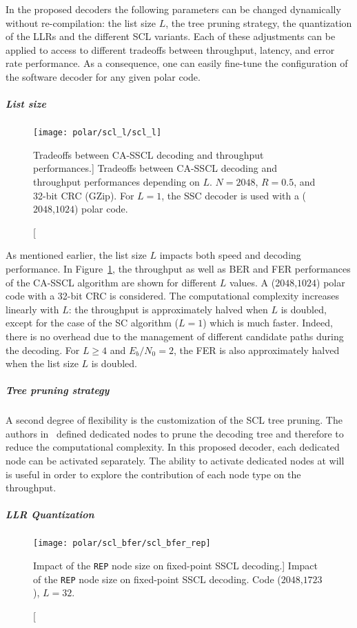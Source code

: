 In the proposed decoders the following parameters can be changed dynamically
without re-compilation: the list size $L$, the tree pruning strategy, the
quantization of the LLRs and the different SCL variants. Each of these
adjustments can be applied to access to different tradeoffs between throughput,
latency, and error rate performance. As a consequence, one can easily fine-tune
the configuration of the software decoder for any given polar code.

\subparagraph{List size}

\begin{figure}[htp]
  \centering
  \texttt{[image: polar/scl\_l/scl\_l]}
  \caption
    [Tradeoffs between CA-SSCL decoding and throughput performances.]
    {Tradeoffs between CA-SSCL decoding and throughput performances depending on
    $L$. $N=2048$, $R=0.5$, and 32-bit CRC (GZip). For $L=1$, the SSC decoder is
    used with a ($2048$,$1024$) polar code.}
  \label{plot:polar_scl_l}
\end{figure}

As mentioned earlier, the list size $L$ impacts both speed and decoding
performance. In Figure~\ref{plot:polar_scl_l}, the throughput as well as BER and
FER performances of the CA-SSCL algorithm are shown for different $L$ values. A
($2048$,$1024$) polar code with a 32-bit CRC is considered. The computational
complexity increases linearly with $L$: the throughput is approximately halved
when $L$ is doubled, except for the case of the SC algorithm ($L=1$) which is
much faster. Indeed, there is no overhead due to the management of different
candidate paths during the decoding. For $L\geq4$ and $E_b/N_0=2$, the FER is
also approximately halved when the list size $L$ is doubled.

\subparagraph{Tree pruning strategy}

A second degree of flexibility is the customization of the SCL tree pruning. The
authors in~\cite{Alamdar-Yazdi2011,Sarkis2016} defined dedicated nodes to prune
the decoding tree and therefore to reduce the computational complexity. In this
proposed decoder, each dedicated node can be activated separately. The ability
to activate dedicated nodes at will is useful in order to explore the
contribution of each node type on the throughput.

\subparagraph{LLR Quantization}

\begin{figure}[htp]
  \centering
  \texttt{[image: polar/scl\_bfer/scl\_bfer\_rep]}
  \caption
    [Impact of the \texttt{REP} node size on fixed-point SSCL decoding.]
    {Impact of the \texttt{REP} node size on fixed-point SSCL decoding.
    Code ($2048$,$1723$), $L=32$.}
  \label{plot:polar_scl_bfer_rep}
\end{figure}


